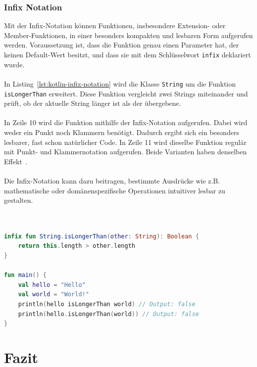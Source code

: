 \documentclass[11pt]{article}
\begin{document}
    \subsubsection{Infix Notation}
    Mit der Infix-Notation können Funktionen, insbesondere Extension- oder Member-Funktionen, in einer besonders kompakten und lesbaren Form aufgerufen werden.
    Voraussetzung ist, dass die Funktion genau einen Parameter hat, der keinen Default-Wert besitzt, und dass sie mit dem Schlüsselwort \texttt{infix} deklariert wurde.\\
    \\
    In Listing~\ref{lst:kotlin-infix-notation} wird die Klasse \texttt{String} um die Funktion \texttt{isLongerThan} erweitert.
    Diese Funktion vergleicht zwei Strings miteinander und prüft, ob der aktuelle String länger ist als der übergebene.\\
    \\
    In Zeile 10 wird die Funktion mithilfe der Infix-Notation aufgerufen.
    Dabei wird weder ein Punkt noch Klammern benötigt.
    Dadurch ergibt sich ein besonders lesbarer, fast schon natürlicher Code.
    In Zeile 11 wird dieselbe Funktion regulär mit Punkt- und Klammernotation aufgerufen.
    Beide Varianten haben denselben Effekt~\cite{kotlin-infix-notation}.\\
    \\
    Die Infix-Notation kann dazu beitragen, bestimmte Ausdrücke wie z.B. mathematische oder domänenspezifische Operationen intuitiver lesbar zu gestalten.\\
    \\

    \begin{lstlisting}[language=Kotlin, caption={InfixNotation.kt}, label={lst:kotlin-infix-notation}]

infix fun String.isLongerThan(other: String): Boolean {
    return this.length > other.length
}

fun main() {
    val hello = "Hello"
    val world = "World!"
    println(hello isLongerThan world) // Output: false
    println(hello.isLongerThan(world)) // Output: false
}
    \end{lstlisting}

    \section{Fazit}
\end{document}
